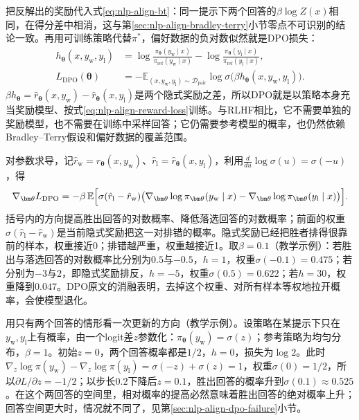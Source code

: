 把反解出的奖励代入式\eqref{eq:nlp-align-bt}：同一提示下两个回答的$\beta\log Z(x)$相同，在得分差中相消，这与第\ref{sec:nlp-align-bradley-terry}小节零点不可识别的结论一致。再用可训练策略代替$\pi^*$，偏好数据的负对数似然就是DPO损失：
\begin{equation}
\label{eq:nlp-align-dpo-loss}
\begin{aligned}
 h_{\bm{\theta}}(x,y_{\mathrm w},y_{\mathrm l})
 &=\log\frac{\pi_{\bm{\theta}}(y_{\mathrm w}\mid x)}{\pi_{\mathrm{ref}}(y_{\mathrm w}\mid x)}
  -\log\frac{\pi_{\bm{\theta}}(y_{\mathrm l}\mid x)}{\pi_{\mathrm{ref}}(y_{\mathrm l}\mid x)},\\
 L_{\mathrm{DPO}}(\bm{\theta})
 &=-\mathbb{E}_{(x,y_{\mathrm w},y_{\mathrm l})\sim\mathcal{D}_{\mathrm{pair}}}
       \log\sigma\bigl(\beta h_{\bm{\theta}}(x,y_{\mathrm w},y_{\mathrm l})\bigr).
\end{aligned}
\end{equation}
$\beta h_{\bm\theta}=\hat r_{\bm\theta}(x,y_{\mathrm w})-\hat r_{\bm\theta}(x,y_{\mathrm l})$是两个隐式奖励之差，所以DPO就是以策略本身充当奖励模型、按式\eqref{eq:nlp-align-reward-loss}训练。与RLHF相比，它不需要单独的奖励模型，也不需要在训练中采样回答；它仍需要参考模型的概率，也仍然依赖Bradley--Terry假设和偏好数据的覆盖范围。

对参数求导，记$\hat r_{\mathrm w}=\hat r_{\bm\theta}(x,y_{\mathrm w})$、$\hat r_{\mathrm l}=\hat r_{\bm\theta}(x,y_{\mathrm l})$，利用$\frac{d}{du}\log\sigma(u)=\sigma(-u)$，得
\begin{equation}
\label{eq:nlp-align-dpo-gradient}
 \nabla_{\bm\theta}L_{\mathrm{DPO}}
 =-\beta\,\mathbb E\Bigl[\sigma(\hat r_{\mathrm l}-\hat r_{\mathrm w})
 \bigl(\nabla_{\bm\theta}\log\pi_{\bm\theta}(y_{\mathrm w}\mid x)-\nabla_{\bm\theta}\log\pi_{\bm\theta}(y_{\mathrm l}\mid x)\bigr)\Bigr].
\end{equation}
括号内的方向提高胜出回答的对数概率、降低落选回答的对数概率；前面的权重$\sigma(\hat r_{\mathrm l}-\hat r_{\mathrm w})$是当前隐式奖励把这一对排错的概率。隐式奖励已经把胜者排得很靠前的样本，权重接近0；排错越严重，权重越接近1。取$\beta=0.1$（教学示例）：若胜出与落选回答的对数概率比分别为$0.5$与$-0.5$，$h=1$，权重$\sigma(-0.1)=0.475$；若分别为$-3$与$2$，即隐式奖励排反，$h=-5$，权重$\sigma(0.5)=0.622$；若$h=30$，权重降到$0.047$。DPO原文的消融表明，去掉这个权重、对所有样本等权地拉开概率，会使模型退化。

用只有两个回答的情形看一次更新的方向（教学示例）。设策略在某提示下只在$y_{\mathrm w},y_{\mathrm l}$上有概率，由一个logit差$z$参数化：$\pi_{\bm\theta}(y_{\mathrm w})=\sigma(z)$；参考策略为均匀分布，$\beta=1$。初始$z=0$，两个回答概率都是$1/2$，$h=0$，损失为$\log2$。此时$\nabla_z\log\pi(y_{\mathrm w})-\nabla_z\log\pi(y_{\mathrm l})=\sigma(-z)+\sigma(z)=1$，权重$\sigma(0)=1/2$，所以$\partial L/\partial z=-1/2$；以步长$0.2$下降后$z=0.1$，胜出回答的概率升到$\sigma(0.1)\approx0.525$。在这个两回答的空间里，相对概率的提高必然意味着胜出回答的绝对概率上升；回答空间更大时，情况就不同了，见第\ref{sec:nlp-align-dpo-failure}小节。

